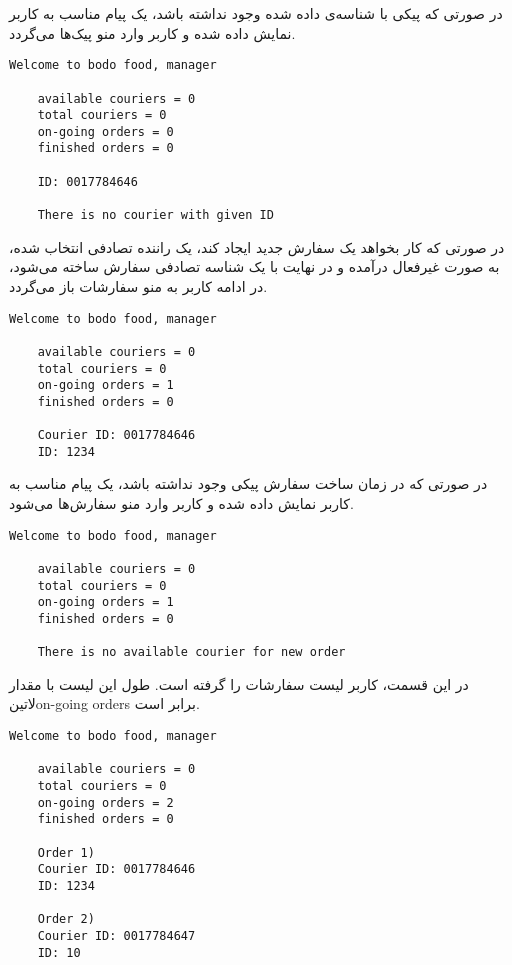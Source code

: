 \documentclass[../main.tex]{subfiles}
\begin{document}
در صورتی که پیکی با شناسه‌ی داده شده وجود نداشته باشد، یک پیام مناسب به کاربر نمایش داده شده و کاربر وارد منو پیک‌ها می‌گردد.

\begin{latin}
\begin{lstlisting}[]
    Welcome to bodo food, manager

    available couriers = 0
    total couriers = 0
    on-going orders = 0
    finished orders = 0

    ID: 0017784646

    There is no courier with given ID
\end{lstlisting}
\end{latin}

در صورتی که کار بخواهد یک سفارش جدید ایجاد کند، یک راننده تصادفی انتخاب شده، به صورت غیرفعال درآمده و در نهایت با یک شناسه تصادفی سفارش ساخته می‌شود، در ادامه کاربر به منو سفارشات باز می‌گردد.

\begin{latin}
\begin{lstlisting}[]
    Welcome to bodo food, manager

    available couriers = 0
    total couriers = 0
    on-going orders = 1
    finished orders = 0

    Courier ID: 0017784646
    ID: 1234

\end{lstlisting}
\end{latin}

در صورتی که در زمان ساخت سفارش پیکی وجود نداشته باشد، یک پیام مناسب به کاربر نمایش داده شده و کاربر وارد منو سفارش‌ها می‌شود.

\begin{latin}
\begin{lstlisting}[]
    Welcome to bodo food, manager

    available couriers = 0
    total couriers = 0
    on-going orders = 1
    finished orders = 0

    There is no available courier for new order
\end{lstlisting}
\end{latin}

در این قسمت، کاربر لیست سفارشات را گرفته است. طول این لیست با مقدار ‌لاتین{on-going orders} برابر است.

\begin{latin}
\begin{lstlisting}[]
    Welcome to bodo food, manager

    available couriers = 0
    total couriers = 0
    on-going orders = 2
    finished orders = 0

    Order 1)
    Courier ID: 0017784646
    ID: 1234

    Order 2)
    Courier ID: 0017784647
    ID: 10

\end{lstlisting}
\end{latin}
\end{document}
